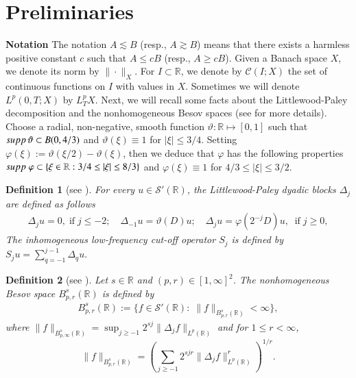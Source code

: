 \documentclass[12pt]{article}
\newtheorem{definition}{Definition}[section]
\newcommand{\R}{\mathbb{R}}
\newcommand{\les}{\lesssim}
\begin{document}
\section{Preliminaries}\label{sec2}
{\bf Notation}\;
The notation $A\les B$ (resp., $A \gtrsim B$) means that there exists a harmless positive constant $c$ such that $A \leq cB$ (resp., $A \geq cB$).
Given a Banach space $X$, we denote its norm by $\|\cdot\|_{X}$. For $I\subset\R$, we denote by $\mathcal{C}(I;X)$ the set of continuous functions on $I$ with values in $X$. Sometimes we will denote $L^p(0,T;X)$ by $L_T^pX$.
Next, we will recall some facts about the Littlewood-Paley decomposition and the nonhomogeneous Besov spaces (see \cite{BCD} for more details).
Choose a radial, non-negative, smooth function $\vartheta:\R\mapsto [0,1]$ such that
 ${\rm{supp}} \,\vartheta\subset B(0, 4/3)$ and $\vartheta(\xi)\equiv1$ for $|\xi|\leq3/4$.
Setting $\varphi(\xi):=\vartheta(\xi/2)-\vartheta(\xi)$, then we deduce that $\varphi$ has the following properties
${\rm{supp}} \;\varphi\subset \left\{\xi\in \R: 3/4\leq|\xi|\leq8/3\right\}$ and $\varphi(\xi)\equiv 1$ for $4/3\leq |\xi|\leq 3/2$.

\begin{definition}[see \cite{BCD}]
For every $u\in \mathcal{S'}(\mathbb{R})$, the Littlewood-Paley dyadic blocks ${\Delta}_j$ are defined as follows
\begin{align*}
\Delta_ju=0,\; \text{if}\; j\leq-2;\quad
\Delta_{-1}u=\vartheta(D)u;\quad
\Delta_ju=\varphi(2^{-j}D)u,\; \; \text{if}\;j\geq0,
\end{align*}
The inhomogeneous low-frequency cut-off operator $S_j$ is defined by
$
S_ju=\sum_{q=-1}^{j-1}{\Delta}_qu.
$
\end{definition}
\begin{definition}[see \cite{BCD}]
Let $s\in\mathbb{R}$ and $(p,r)\in[1, \infty]^2$. The nonhomogeneous Besov space $B^{s}_{p,r}(\R)$ is defined by
\begin{align*}
B^{s}_{p,r}(\R):=\Big\{f\in \mathcal{S}'(\R):\;\|f\|_{B^{s}_{p,r}(\mathbb{R})}<\infty\Big\},
\end{align*}
where $\|f\|_{B^{s}_{p,\infty}(\mathbb{R})}=\sup_{j\geq-1}2^{sj}\|\Delta_jf\|_{L^p(\mathbb{R})}$ and for $1\leq r<\infty$,
$$\|f\|_{B^{s}_{p,r}(\mathbb{R})}=
\left(\sum_{j\geq-1}2^{sjr}\|\Delta_jf\|^r_{L^p(\mathbb{R})}\right)^{1/r}.$$
\end{definition}
\end{document}
